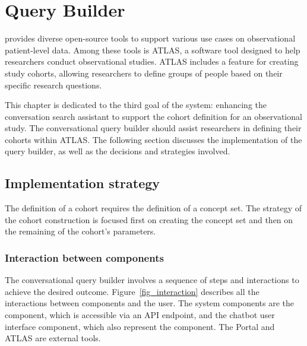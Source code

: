 \chapter{Query Builder}
\label{chapter:QB}

{\ohdsi} provides diverse open-source tools to support various use cases on observational patient-level data. Among these tools is ATLAS, a software tool designed to help researchers conduct observational studies. ATLAS includes a feature for creating study cohorts, allowing researchers to define groups of people based on their specific research questions.

This chapter is dedicated to the third goal of the system: enhancing the conversation search assistant to support the cohort definition for an observational study. The conversational query builder should assist researchers in defining their cohorts within ATLAS. The following section discusses the implementation of the query builder, as well as the decisions and strategies involved.


\section{Implementation strategy}


The definition of a cohort requires the definition of a concept set. The strategy of the cohort construction is focused first on creating the concept set and then on the remaining of the cohort's parameters.


\subsection{Interaction between components}

The conversational query builder involves a sequence of steps and interactions to achieve the desired outcome. Figure~\ref{fig_interaction} describes all the interactions between components and the user. The system components are the {\ir} component, which is accessible via an API endpoint, and the chatbot user interface component, which also represent the {\llm} component. The {\ehden} Portal and ATLAS are external tools.

